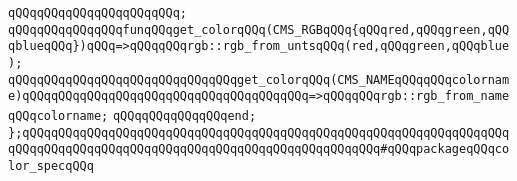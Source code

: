 \verb|qQQqqQQqqQQqqQQqqQQqqQQq;|\newline
\newline
\verb|qQQqqQQqqQQqqQQqfunqQQqget_colorqQQq(CMS_RGBqQQq{qQQqred,qQQqgreen,qQQqblueqQQq})qQQq=>qQQqqQQqrgb::rgb_from_untsqQQq(red,qQQqgreen,qQQqblue);|\newline
\verb|qQQqqQQqqQQqqQQqqQQqqQQqqQQqqQQqget_colorqQQq(CMS_NAMEqQQqqQQqcolorname)qQQqqQQqqQQqqQQqqQQqqQQqqQQqqQQqqQQqqQQq=>qQQqqQQqrgb::rgb_from_nameqQQqcolorname;|\newline
\verb|qQQqqQQqqQQqqQQqend;|\newline
\newline
\newline
\verb|};qQQqqQQqqQQqqQQqqQQqqQQqqQQqqQQqqQQqqQQqqQQqqQQqqQQqqQQqqQQqqQQqqQQqqQQqqQQqqQQqqQQqqQQqqQQqqQQqqQQqqQQqqQQqqQQqqQQqqQQq#qQQqpackageqQQqcolor_specqQQq|\newline
\newline
\newline
\newline

